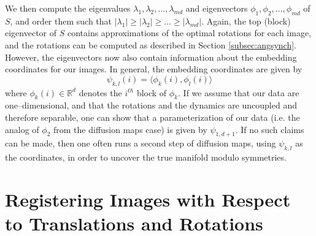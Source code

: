 \documentclass{pnastwo}
\begin{document}
\begin{article}
\begin{materials}
We then compute the eigenvalues $\lambda_1, \lambda_2, \dots, \lambda_{md}$ and eigenvectors $\phi_1, \phi_2, \dots, \phi_{md}$ of $S$, and order them such that $|\lambda_1| \ge |\lambda_2| \ge \dots \ge |\lambda_{md}|$.
%
Again, the top (block) eigenvector of $S$ contains approximations of the optimal rotations for each image, and the rotations can be computed as described in Section \ref{subsec:angsynch}.
%
However, the eigenvectors now also contain information about the embedding coordinates for our images.
%
In general, the embedding coordinates are given by 
\begin{equation}
\psi_{k,l} (i) = \langle \phi_k(i), \phi_l(i) \rangle
\end{equation}
where $\phi_k(i) \in \mathbb{R}^d$ denotes the $i^{th}$ block of $\phi_k$.
%
If we assume that our data are one--dimensional, and that the rotations and the dynamics are uncoupled and therefore separable, one can show that a parameterization of our data (i.e. the analog of $\phi_2$ from the diffusion maps case) is given by $\psi_{1,d+1}$.
%
If no such claims can be made, then one often runs a second step of diffusion maps, using $\psi_{k,l}$ as the coordinates, in order to uncover the true manifold modulo symmetries. 



\section{Registering Images with Respect to Translations and Rotations} \label{subsec:trans_rot_register}


\end{materials}
\end{article}
\end{document}
